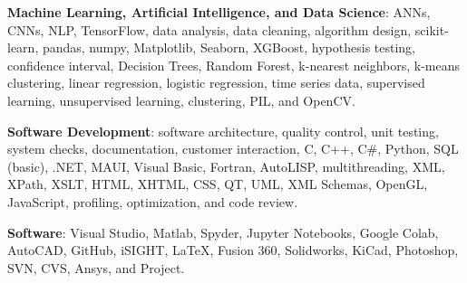 \documentclass{leresume}
\begin{document}
    \begin{bulletedlist}
		
		\item \textbf{Machine Learning, Artificial Intelligence, and Data Science}: ANNs,
                        CNNs,
                        NLP,
                        TensorFlow,
                        data analysis,
                        data cleaning,
                        algorithm design,
                        scikit-learn,
                        pandas,
                        numpy,
                        Matplotlib,
                        Seaborn,
                        XGBoost,
                        hypothesis testing,
                        confidence interval,
                        Decision Trees,
                        Random Forest,
                        k-nearest neighbors,
                        k-means clustering,
                        linear regression,
                        logistic regression,
                        time series data,
                        supervised learning,
                        unsupervised learning,
                        clustering,
                        PIL,
                        and OpenCV.
                        
		\item \textbf{Software Development}: software architecture,
                        quality control,
                        unit testing,
                        system checks,
                        documentation,
                        customer interaction,
                        C,
                        C++,
                        C\#,
                        Python,
                        SQL (basic),
                        .NET,
                        MAUI,
                        Visual Basic,
                        Fortran,
                        AutoLISP,
                        multithreading,
                        XML,
                        XPath,
                        XSLT,
                        HTML,
                        XHTML,
                        CSS,
                        QT,
                        UML,
                        XML Schemas,
                        OpenGL,
                        JavaScript,
                        profiling,
                        optimization,
                        and code review.
                        
		\item \textbf{Software}: Visual Studio,
                        Matlab,
                        Spyder,
                        Jupyter Notebooks,
                        Google Colab,
                        AutoCAD,
                        GitHub,
                        iSIGHT,
                        LaTeX,
                        Fusion 360,
                        Solidworks,
                        KiCad,
                        Photoshop,
                        SVN,
                        CVS,
                        Ansys,
                        and Project.
                        

\end{bulletedlist}
\end{document}
